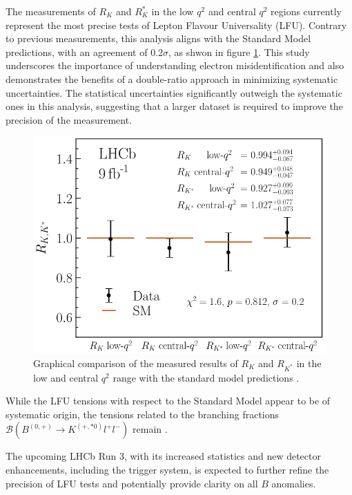 The measurements of $R_K$ and $R_K^*$ in the low $q^2$ 
and central $q^2$ regions currently represent the most 
precise tests of Lepton Flavour Universality (LFU). 
Contrary to previous measurements, this analysis aligns 
with the Standard Model predictions, with an agreement of 
$\num{0.2}\sigma$, as shwon in figure \ref{fig:results}. 
This study underscores the importance of understanding 
electron misidentification and also demonstrates the 
benefits of a double-ratio approach in minimizing 
systematic uncertainties. The statistical uncertainties 
significantly outweigh the systematic ones in this 
analysis, suggesting that a larger dataset is required 
to improve the precision of the measurement.

\begin{figure}
    \centering
    \includegraphics[width=\linewidth]{figures/results.png}
    \caption{Graphical comparison of the measured results of $R_K$ and $R_{K^*}$ in the low and central $q^2$ range with the standard model predictions \cite{lhcbcollaboration2022measurement}.}
    \label{fig:results}
\end{figure}

While the LFU tensions with respect to the Standard Model 
appear to be of systematic origin, the tensions related to 
the branching fractions $\mathcal{B}(B^{(0,+)}\to K^{(+,*0)}l^+l^-)$ 
remain \cite{Branchingfraction}.

The upcoming LHCb Run 3, with its increased statistics and 
new detector enhancements, including the trigger system, is 
expected to further refine the precision of LFU tests and 
potentially provide clarity on all $B$ anomalies.